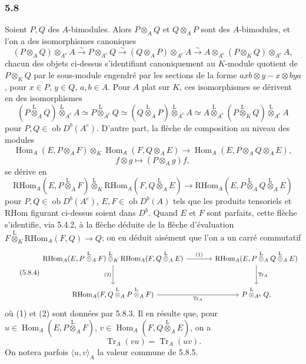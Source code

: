 \documentclass[11pt]{article}
\DeclareMathOperator{\Hom}{Hom}
\newcommand{\ob}{\operatorname{ob}}
\providecommand{\RHom}{\mathrm{RHom}}
\providecommand{\Tr}{\operatorname{Tr}}
\providecommand{\Tr}{\operatorname{Tr}}
\providecommand{\lten}{\overset{\mathrm L}{\otimes}}
\providecommand{\Tr}{\operatorname{Tr}}
\providecommand{\RHom}{\mathrm{RHom}}
\providecommand{\Hom}{\operatorname{Hom}}
\providecommand{\ob}{\operatorname{ob}}
\providecommand{\lten}{\overset{\mathrm L}{\otimes}}
\providecommand{\RHom}{\mathrm R\mathcal{H}om}
\providecommand{\lten}{\overset{\mathrm L}{\otimes}}
\providecommand{\Tr}{\operatorname{Tr}}
\providecommand{\lten}{\overset{\mathrm L}{\otimes}}
\providecommand{\lten}{\overset{\mathrm L}{\otimes}}
\providecommand{\lten}{\overset{\mathrm L}{\otimes}}
\begin{document}
\subsubsection*{5.8}

Soient $P,Q$ des $A$-bimodules. Alors $P\otimes_AQ$ et $Q\otimes_AP$ sont des $A$-bimodules, et l'on a des isomorphismes canoniques
\begin{equation}\tag{5.8.1}
(P\otimes_AQ)\otimes_{A^e}A\xrightarrow{\sim}P\otimes_{A^e}Q\xrightarrow{\sim}(Q\otimes_AP)\otimes_{A^e}A\xrightarrow{\sim}A\otimes_{A^e}(P\otimes_KQ)\otimes_{A^e}A,
\end{equation}
chacun des objets ci-dessus s'identifiant canoniquement au $K$-module quotient de $P\otimes_KQ$ par le sous-module engendré par les sections de la forme $axb\otimes y-x\otimes bya$, pour $x\in P$, $y\in Q$, $a,b\in A$. Pour $A$ plat sur $K$, ces isomorphismes se dérivent en des isomorphismes
\begin{equation}\tag{5.8.2}
(P\lten_AQ)\lten_{A^e}A\simeq P\lten_{A^e}Q\simeq(Q\lten_AP)\lten_{A^e}A\simeq A\lten_{A^e}(P\lten_KQ)\lten_{A^e}A
\end{equation}
pour $P,Q\in\ob D^b(A^e)$. D'autre part, la flèche de composition au niveau des modules
\[
\Hom_A(E,P\otimes_AF)\otimes_K\Hom_A(F,Q\otimes_AE)
\longrightarrow\Hom_A(E,P\otimes_AQ\otimes_AE),
\]
\[
f\otimes g\longmapsto (P\otimes_Ag)f,
\]
se dérive en
\begin{equation}\tag{5.8.3}
\RHom_A(E,P\lten_AF)\lten_K\RHom_A(F,Q\lten_AE)
\longrightarrow\RHom_A(E,P\lten_AQ\lten_AE)
\end{equation}
pour $P,Q\in\ob D^b(A^e)$, $E,F\in\ob D^b(A)$ tels que les produits tensoriels et $\RHom$ figurant ci-dessus soient dans $D^b$. Quand $E$ et $F$ sont parfaits, cette flèche s'identifie, via 5.4.2, à la flèche déduite de la flèche d'évaluation $F\lten_K\RHom_A(F,Q)\to Q$; on en déduit aisément que l'on a un carré commutatif
\begin{equation}\tag{5.8.4}
\begin{tikzcd}[column sep=large,row sep=large]
\RHom_A(E,P\lten_AF)\lten_K\RHom_A(F,Q\lten_AE) \arrow[r,"(1)"] \arrow[d,"(2)"'] & \RHom_A(E,P\lten_AQ\lten_AE) \arrow[d,"\Tr_A"]\\
\RHom_A(F,Q\lten_AP\lten_AF) \arrow[r,"\Tr_A"'] & P\lten_{A^e}Q,
\end{tikzcd}
\end{equation}
où (1) et (2) sont données par 5.8.3. Il en résulte que, pour $u\in\Hom_A(E,P\lten_AF)$, $v\in\Hom_A(F,Q\lten_AE)$, on a
\begin{equation}\tag{5.8.5}
\Tr_A(vu)=\Tr_A(uv).
\end{equation}
On notera parfois $\langle u,v\rangle_A$ la valeur commune de 5.8.5.
\end{document}
